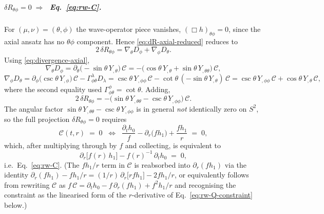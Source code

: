 \subparagraph{$\delta R_{\theta\phi} = 0 \;\Rightarrow\;$
Eq.~\eqref{eq:rw-C}.}
For $(\mu,\nu)=(\theta,\phi)$ the wave-operator piece vanishes,
$(\Box h)_{\theta\phi}=0$, since the axial ansatz has no
$\theta\phi$ component. Hence \eqref{eq:dR-axial-reduced} reduces
to
\begin{equation}
  2\,\delta R_{\theta\phi}
  = \nabla_{\theta}D_{\phi}+\nabla_{\phi}D_{\theta}.
\end{equation}
Using \eqref{eq:divergence-axial},
\begin{equation}
  \nabla_{\theta}D_{\phi}
  = \partial_{\theta}\bigl(-\sin\theta\,Y_{,\theta}\bigr)\,\mathcal{C}
  = -\bigl(\cos\theta\,Y_{,\theta}+\sin\theta\,Y_{,\theta\theta}\bigr)\,\mathcal{C},
\end{equation}
\begin{equation}
  \nabla_{\phi}D_{\theta}
  = \partial_{\phi}\bigl(\csc\theta\,Y_{,\phi}\bigr)\,\mathcal{C}
  - \Gamma^{\lambda}_{\phi\theta}D_{\lambda}\!\!
  = \csc\theta\,Y_{,\phi\phi}\,\mathcal{C}
  - \cot\theta\,(-\sin\theta\,Y_{,\theta})\,\mathcal{C}
  = \csc\theta\,Y_{,\phi\phi}\,\mathcal{C}
  + \cos\theta\,Y_{,\theta}\,\mathcal{C},
\end{equation}
where the second equality used $\Gamma^{\phi}_{\phi\theta}=\cot\theta$.
Adding,
\begin{equation}
  2\,\delta R_{\theta\phi}
  = -\bigl(\sin\theta\,Y_{,\theta\theta}
        - \csc\theta\,Y_{,\phi\phi}\bigr)\,\mathcal{C}.
\end{equation}
The angular factor
$\sin\theta\,Y_{,\theta\theta}-\csc\theta\,Y_{,\phi\phi}$ is in
general \emph{not} identically zero on $S^{2}$, so the full
projection $\delta R_{\theta\phi}=0$ requires
\begin{equation}
  \mathcal{C}(t,r) \;=\; 0
  \;\;\Longleftrightarrow\;\;
  \frac{\partial_{t}h_{0}}{f}
  - \partial_{r}\!\bigl(f h_{1}\bigr)
  + \frac{f h_{1}}{r}
  \;=\; 0,
\end{equation}
which, after multiplying through by $f$ and collecting,
is equivalent to
\begin{equation}
  \partial_{r}\!\bigl[f(r)\,h_{1}\bigr]
  - f(r)^{-1}\,\partial_{t} h_{0}
  \;=\; 0,
\label{eq:rw-C-derived}
\end{equation}
i.e.\ Eq.~\eqref{eq:rw-C}. (The $f h_{1}/r$ term in
$\mathcal{C}$ is reabsorbed into $\partial_{r}(f h_{1})$ via
the identity
$\partial_{r}(f h_{1}) - f h_{1}/r
  = (1/r)\,\partial_{r}\!\bigl[r f h_{1}\bigr] - 2 f h_{1}/r$,
or equivalently follows from rewriting
$\mathcal{C}$ as
$f\,\mathcal{C}=\partial_{t}h_{0}-f\,\partial_{r}(f h_{1})
  + f^{2} h_{1}/r$ and recognising the constraint as the
linearised form of the $r$-derivative of
Eq.~\eqref{eq:rw-Q-constraint} below.)

